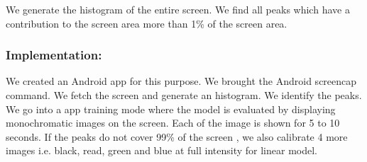 We generate the histogram of the entire screen. We find all peaks which have
a contribution to the screen area more than 1\% of the screen area.
\fi

\subsubsection{Implementation:}
We created an Android app for this purpose.
We brought the Android screencap command. We fetch
the screen and generate an histogram.
We identify the peaks. We go into a app training mode where the model is evaluated
by displaying monochromatic images on the screen. Each of the image is shown for 5 to 10
seconds.
If the peaks do not cover 99\% of the screen , we also calibrate 4 more images i.e.
black, read, green and blue at full intensity for linear model.
\fi


